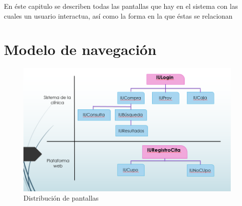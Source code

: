 En \'este capitulo se describen todas las pantallas que hay en el sistema con las cuales un usuario interactua, as\'i como la forma en la que \'estas se relacionan

\section{Modelo de navegación}



\begin{figure}[htbp]
	\begin{center}
		\includegraphics[width=.9\textwidth]{images/gui/nav-pantallas}
		\caption{Distribuci\'on de pantallas}
		\label{fig:mapa}
	\end{center}
\end{figure}

